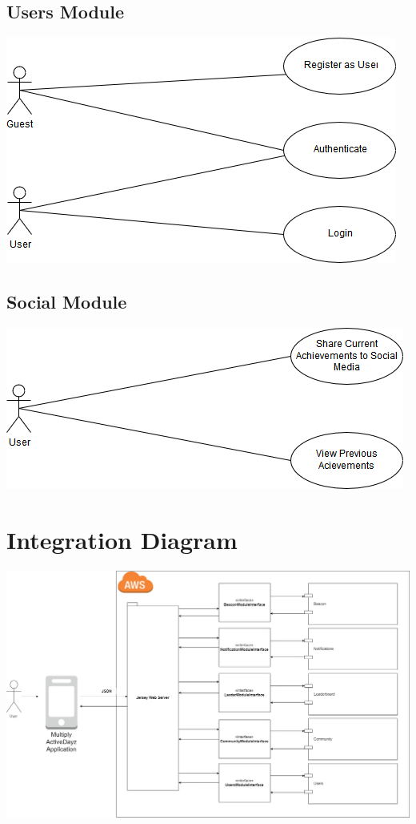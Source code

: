 \documentclass[11pt]{article}
\begin{document}
\subsection{Users Module}
\includegraphics[width=0.7\linewidth]{images/UserManagement.png}\\[1cm]
\subsection{Social Module}
\includegraphics[width=0.7\linewidth]{images/Social.png}\\[1cm]

\section{Integration Diagram}
\includegraphics[width=175mm, scale=1.5]{images/Integration.jpg}\\[1cm]
\end{document}
